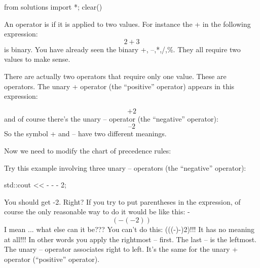 \begin{python0}
from solutions import *; clear()
\end{python0}
An operator is  if it is applied to two values. For instance the +
in the following expression:
\[2+3\]
is binary. You have already seen the binary +, –,*,/,\%. They all require
two values to make sense.

There are actually two operators that require only one value. These are  operators. The unary + operator (the “positive” operator)
appears in this expression:



\[+2\]
and of course there's the unary – operator (the “negative” operator):
\[–2\]
So the symbol + and – have two different meanings.

Now we need to modify the chart of precedence rules:

  
\noindent{}

%

Try this example involving three unary – operators (the “negative”
operator):
\begin{console}
std::cout << - - - 2;
\end{console}
You should get -2. Right? If you try to put parentheses in the expression,
of course the only reasonable way to do it would be like this:
-\[(-(-2))\]
I mean ... what else can it be??? You can't do this: (((-)-)2)!!! It has
no meaning at all!!!
In other words you apply the rightmost – first. The last – is the leftmost.
The unary – operator associates right to left. It's the same for the unary +
operator (“positive” operator).


